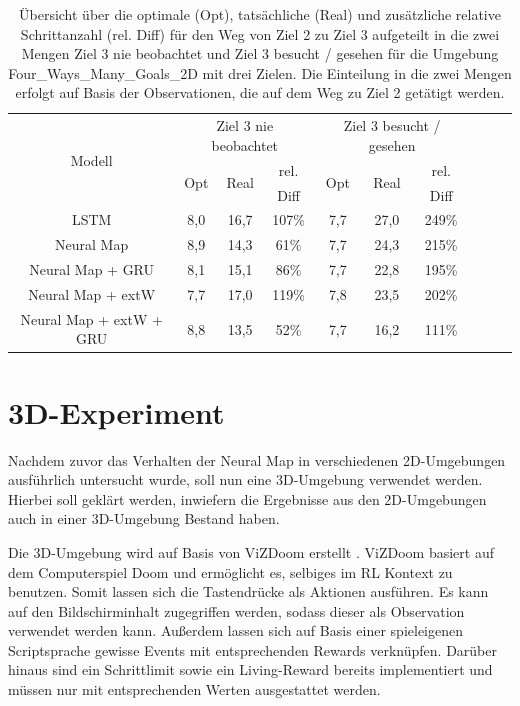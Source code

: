 \begin{table}[h]
  \begin{tabular}{|c|c|c|c|c|c|c|c|c|c|}
    \hline
    \multirow{3}{*}{Modell} & \multicolumn{3}{|c|}{Ziel 3 nie beobachtet} & \multicolumn{3}{|c|}{Ziel 3 besucht / gesehen} \\ \cline{2-7}
    & \multirow{2}{*}{Opt} & \multirow{2}{*}{Real} & rel. & \multirow{2}{*}{Opt} & \multirow{2}{*}{Real} & rel. \\
    & & & Diff & & & Diff \\ \hline
    LSTM & 8,0 & 16,7 & 107\% & 7,7 & 27,0 & 249\% \\ \hline
    Neural Map & 8,9 & 14,3 & 61\% & 7,7 & 24,3 & 215\% \\ \hline
    Neural Map + GRU & 8,1 & 15,1 & 86\% & 7,7 & 22,8 & 195\% \\ \hline
    Neural Map + extW & 7,7 & 17,0 & 119\% & 7,8 & 23,5 & 202\% \\ \hline
    Neural Map + extW + GRU & 8,8 & 13,5 & 52\% & 7,7 & 16,2 & 111\% \\ \hline
  \end{tabular}
  \caption{Übersicht über die optimale (Opt), tatsächliche (Real) und zusätzliche relative Schrittanzahl (rel. Diff) für den Weg von Ziel 2 zu Ziel 3 aufgeteilt in die zwei Mengen \glqq Ziel 3 nie beobachtet\grqq{} und \glqq Ziel 3 besucht / gesehen\grqq{} für die Umgebung \glqq Four\_Ways\_Many\_Goals\_2D\grqq{} mit drei Zielen. Die Einteilung in die zwei Mengen erfolgt auf Basis der Observationen, die auf dem Weg zu Ziel 2 getätigt werden.}
  \label{results_fw3g_2_to_3_per_M}
\end{table}


\section{3D-Experiment}
\label{sec_3d_exp}

Nachdem zuvor das Verhalten der Neural Map in verschiedenen 2D-Umgebungen ausführlich untersucht wurde, soll nun eine 3D-Umgebung verwendet werden. Hierbei soll geklärt werden, inwiefern die Ergebnisse aus den 2D-Umgebungen auch in einer 3D-Umgebung Bestand haben.

Die 3D-Umgebung wird auf Basis von ViZDoom erstellt \cite{VizDoom}. ViZDoom basiert auf dem Computerspiel Doom und ermöglicht es, selbiges im RL Kontext zu benutzen. Somit lassen sich die Tastendrücke als Aktionen ausführen. Es kann auf den Bildschirminhalt zugegriffen werden, sodass dieser als Observation verwendet werden kann. Außerdem lassen sich auf Basis einer spieleigenen Scriptsprache gewisse Events mit entsprechenden Rewards verknüpfen. Darüber hinaus sind ein Schrittlimit sowie ein Living-Reward bereits implementiert und müssen nur mit entsprechenden Werten ausgestattet werden.

